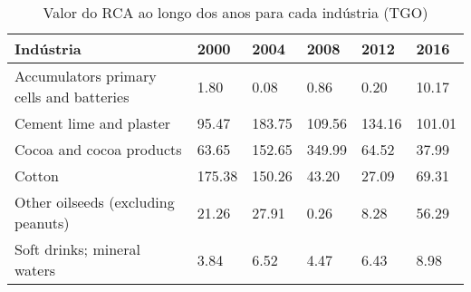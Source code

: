 \begin{table}
\centering
\caption{Valor do RCA ao longo dos anos para cada indústria (TGO)}
\begin{tabular}{p{6cm}p{1.5cm}p{1.5cm}p{1.5cm}p{1.5cm}p{1.5cm}}
\toprule
                               Indústria &   2000 &   2004 &   2008 &   2012 &   2016 \\
\midrule
Accumulators primary cells and batteries &   1.80 &   0.08 &   0.86 &   0.20 &  10.17 \\
                 Cement lime and plaster &  95.47 & 183.75 & 109.56 & 134.16 & 101.01 \\
                Cocoa and cocoa products &  63.65 & 152.65 & 349.99 &  64.52 &  37.99 \\
                                  Cotton & 175.38 & 150.26 &  43.20 &  27.09 &  69.31 \\
      Other oilseeds (excluding peanuts) &  21.26 &  27.91 &   0.26 &   8.28 &  56.29 \\
             Soft drinks; mineral waters &   3.84 &   6.52 &   4.47 &   6.43 &   8.98 \\
\bottomrule
\end{tabular}
\end{table}
